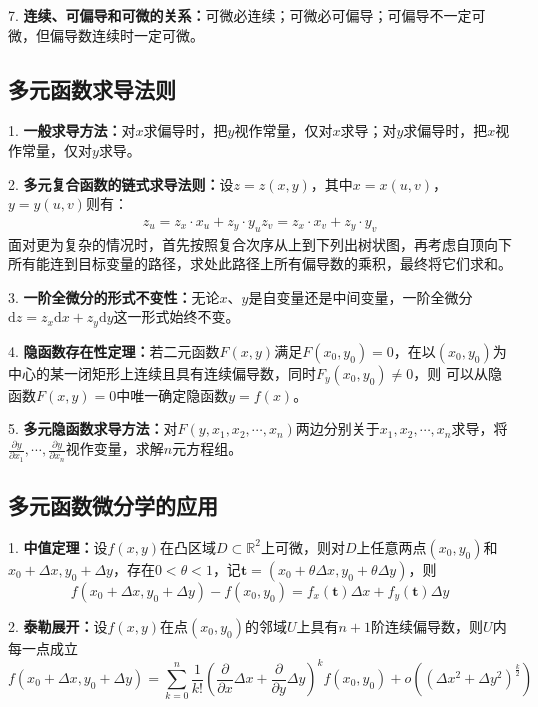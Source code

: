 7. \textbf{连续、可偏导和可微的关系：}可微必连续；可微必可偏导；可偏导不一定可微，但偏导数连续时一定可微。

\subsection{多元函数求导法则}

1. \textbf{一般求导方法：}对$x$求偏导时，把$y$视作常量，仅对$x$求导；对$y$求偏导时，把$x$视作常量，仅对$y$求导。

2. \textbf{多元复合函数的链式求导法则：}设$z=z(x,y)$，其中$x=x(u,v)$，$y=y(u,v)$则有：
\begin{eqnarray*}
    z_u=z_x\cdot x_u+z_y \cdot y_u
    z_v = z_x \cdot x_v +z_y \cdot y_v
\end{eqnarray*}
面对更为复杂的情况时，首先按照复合次序从上到下列出树状图，再考虑自顶向下所有能连到目标变量的路径，求处此路径上所有偏导数的乘积，最终将它们求和。

3. \textbf{一阶全微分的形式不变性：}无论$x$、$y$是自变量还是中间变量，一阶全微分$\mathrm{d}z=z_x\mathrm{d}x+z_y\mathrm{d}y$这一形式始终不变。

4. \textbf{隐函数存在性定理：}若二元函数$F(x,y)$满足$F(x_0,y_0)=0$，在以$(x_0,y_0)$为中心的某一闭矩形上连续且具有连续偏导数，同时$F_y(x_0,y_0)\neq 0$，则
可以从隐函数$F(x,y)=0$中唯一确定隐函数$y=f(x)$。

5. \textbf{多元隐函数求导方法：}对$F(y,x_1,x_2,\cdots,x_n)$两边分别关于$x_1,x_2,\cdots,x_n$求导，将$\frac{\partial y}{\partial x_1},\cdots,\frac{\partial y}{\partial x_n}$视作变量，求解$n$元方程组。

\subsection{多元函数微分学的应用}

1. \textbf{中值定理：}设$f(x,y)$在凸区域$D\subset \mathbb{R}^2$上可微，则对$D$上任意两点$(x_0,y_0)$和$x_0+\Delta x,y_0+\Delta y$，存在$0<\theta<1$，记$\boldsymbol{t }= (x_0+\theta \Delta x,y_0+\theta \Delta y)$，则
\begin{equation*}
    f(x_0+\Delta x,y_0+\Delta y)-f(x_0,y_0)=f_x(\boldsymbol{t})\Delta x+f_y(\boldsymbol{t})\Delta y
\end{equation*}

2. \textbf{泰勒展开：}设$f(x,y)$在点$(x_0,y_0)$的邻域$U$上具有$n+1$阶连续偏导数，则$U$内每一点成立
\begin{equation*}
    f(x_0+\Delta x,y_0+\Delta y)=\sum\limits_{k=0}^n \frac{1}{k!}\left(\frac{\partial}{\partial x}\Delta x +\frac{\partial}{\partial y}\Delta y\right)^k f(x_0,y_0)+o\left(\left(\Delta x^2+\Delta y^2\right)^\frac{k}{2}\right)
\end{equation*}

